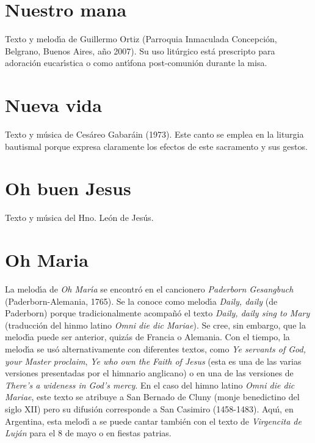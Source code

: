 \documentclass[landscape,12pt]{report}
\begin{document}
\section*{\small Nuestro mana} \noindent\footnotesize Texto y melod\'\i a de Guillermo Ortiz (Parroquia Inmaculada Concepci\'on, Belgrano, Buenos Aires, a\~no 2007). Su uso lit\'urgico est\'a prescripto para adoraci\'on eucar\'\i stica o como ant\'\i fona post-comuni\'on durante la misa.
\section*{\small Nueva vida} \noindent\footnotesize Texto y m\'usica de Ces\'areo Gabar\'ain (1973). Este canto se emplea en la liturgia bautismal porque expresa claramente los efectos de este sacramento y sus gestos. 
\section*{\small Oh buen Jesus} \noindent\footnotesize Texto y m\'usica del Hno. Le\'on de Jes\'us. 
\section*{\small Oh Maria} \noindent\footnotesize La melod\'\i a de \emph{Oh Mar\'\i a} se encontr\'o en el cancionero \emph{Paderborn Gesangbuch} (Paderborn-Alemania, 1765). Se la conoce como melod\'\i a \emph{Daily, daily} (de Paderborn) porque tradicionalmente acompa\~n\'o el texto \emph{Daily, daily sing to Mary} (traducci\'on del hinmo latino \emph{Omni die dic Mariae}). Se cree, sin embargo, que la melod\'\i a puede ser anterior, quiz\'as de Francia o Alemania. Con el tiempo, la melod\'\i a se us\'o alternativamente con diferentes textos, como \emph{Ye servants of God, your Master proclaim}, \emph{Ye who own the Faith of Jesus} (esta es una de las varias versiones presentadas por el himnario anglicano) o en una de las versiones de \emph{There's a wideness in God's mercy}. En el caso del himno latino \emph{Omni die dic Mariae}, este texto se atribuye a San Bernado de Cluny (monje benedictino del siglo XII) pero su difusi\'on corresponde a San Casimiro (1458-1483). Aqu\'\i , en Argentina, esta melod\'\i 
a se puede cantar tambi\'en con el texto de \textit{Virgencita de Luj\'an} para el 8 de mayo o en fiestas patrias. 
\end{document}
